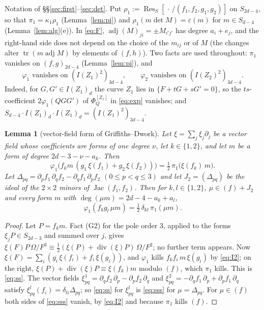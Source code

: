 \documentclass[11pt]{article}
\numberwithin{equation}{section}
\newtheorem{lemma}[theorem]{Lemma}
\theoremstyle{remark}
\newcommand{\Res}{\operatorname{Res}}
\newcommand{\adj}{\operatorname{adj}}
\begin{document}
Notation of \S\S\ref{sec:first}--\ref{sec:det}. Put $\rho_1:=\Res_S[\,\cdot\,/(f_1,f_2,g_1,g_2)]$ on $S_{2d-4}$,
so that $\pi_1=\kappa_1\rho_1$ (Lemma~\ref{lem:pi}) and $\rho_1(m\det M)=\varepsilon(m)$ for $m\in S_{d-4}$
(Lemma~\ref{lem:alg}(e)). In \eqref{eq:F}, $\adj(M)_{ji}=\pm M_{i'j'}$ has degree $a_i+e_j$, and the right-hand
side does not depend on the choice of the $m_{ij}$ or of $M$ (the changes alter $\operatorname{tr}(m\adj M)$ by
elements of $(f,h)$). Two facts are used throughout:
$\pi_1$ vanishes on $(f,g)_{2d-4}$ (Lemma~\ref{lem:pi}), and
\begin{equation}\label{eq:I2}
\varphi_1\text{ vanishes on }(I(Z_1)^2)_{3d-4},\qquad \varphi_2\text{ vanishes on }(I(Z_2)^2)_{3d-4}.
\end{equation}
Indeed, for $G,G'\in I(Z_1)_d$ the curve $Z_1$ lies in $\{F+tG+sG'=0\}$, so the $ts$-coefficient
$2\varphi_1(QGG')$ of $\Phi^{[Z_1]}_Q$ in \eqref{eq:exp} vanishes; and
$S_{d-4}\cdot I(Z_1)_d\cdot I(Z_1)_d=(I(Z_1)^2)_{3d-4}$.

\begin{lemma}[vector-field form of Griffiths--Dwork]\label{lem:vf}
Let $\xi=\sum_j\xi_j\partial_j$ be a vector field whose coefficients are forms of one degree $\nu$, let
$k\in\{1,2\}$, and let $m$ be a form of degree $2d-3-\nu-a_k$. Then
\begin{equation}\label{eq:ss}
\varphi_1\bigl(f_km\,(g_1\,\xi(f_1)+g_2\,\xi(f_2))\bigr)=\tfrac12\,\pi_1\bigl(\xi(f_k)\,m\bigr).
\end{equation}
Let $\Delta_{pq}=\partial_pf_1\,\partial_qf_2-\partial_qf_1\,\partial_pf_2$ $(0\le p<q\le3)$ and let
$J_2=(\Delta_{pq})$ be the ideal of the $2\times2$ minors of $\operatorname{Jac}(f_1,f_2)$. Then for
$k,l\in\{1,2\}$, $\mu\in(f)+J_2$ and every form $m$ with $\deg(\mu m)=2d-4-a_k+a_l$,
\begin{equation}\label{eq:sss}
\varphi_1(f_kg_l\,\mu m)=\tfrac12\,\delta_{kl}\,\pi_1(\mu m).
\end{equation}
\end{lemma}
\begin{proof}
Let $P=f_km$. Fact (G2) for the pole order $3$, applied to the forms $\xi_jP\in S_{2d-3}$ and summed over $j$,
gives $\xi(F)P\,\Omega/F^3\equiv\frac12(\xi(P)+\operatorname{div}(\xi)P)\,\Omega/F^2$; no further term appears.
Now $\xi(F)=\sum_i(g_i\,\xi(f_i)+f_i\,\xi(g_i))$, and $\varphi_1$ kills $f_kf_i\,m\,\xi(g_i)$ by \eqref{eq:I2}; on
the right, $\xi(P)+\operatorname{div}(\xi)P\equiv\xi(f_k)m$ modulo $(f)$, which $\pi_1$ kills. This is
\eqref{eq:ss}. The vector fields $\xi^1_{pq}=\partial_qf_2\,\partial_p-\partial_pf_2\,\partial_q$ and
$\xi^2_{pq}=-\partial_qf_1\,\partial_p+\partial_pf_1\,\partial_q$ satisfy
$\xi^l_{pq}(f_i)=\delta_{li}\Delta_{pq}$; so \eqref{eq:ss} for $\xi^l_{pq}$ is \eqref{eq:sss} for
$\mu=\Delta_{pq}$. For $\mu\in(f)$ both sides of \eqref{eq:sss} vanish, by \eqref{eq:I2} and because $\pi_1$
kills $(f)$.
\end{proof}
\end{document}
